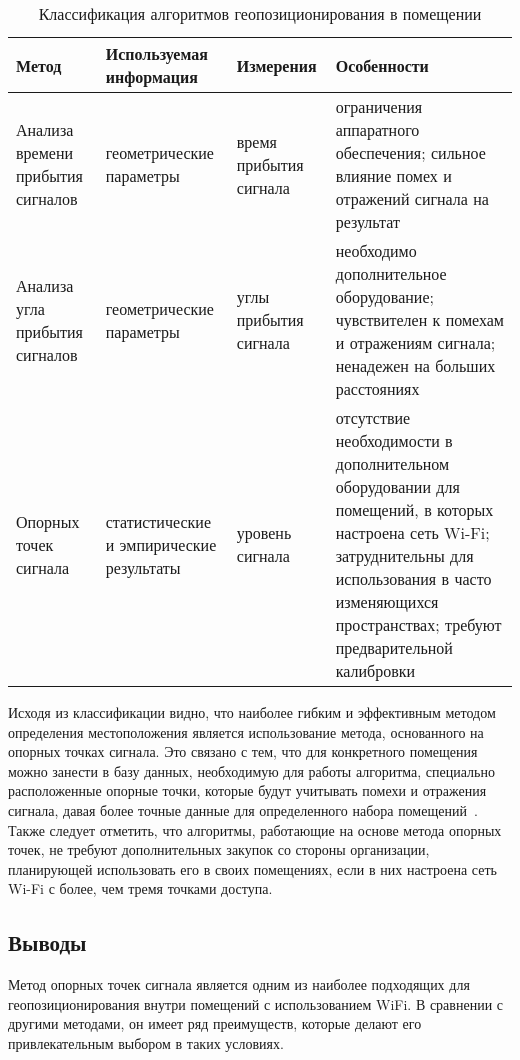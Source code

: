 \begin{table}[ht]
    \caption{Классификация алгоритмов геопозиционирования в помещении}
    \begin{tabular}{|m{3cm}|m{3.5cm}|m{3cm}|m{5.5cm}|}
        \hline
        Метод & Используемая информация & Измерения & Особенности \\
        \hline
        \hline
        Анализа времени прибытия сигналов & геометрические параметры & время прибытия сигнала & ограничения аппаратного обеспечения; сильное влияние помех и отражений сигнала на результат \\
        \hline
        Анализа угла прибытия сигналов & геометрические параметры & углы прибытия сигнала & необходимо дополнительное оборудование; чувствителен к помехам и отражениям сигнала; ненадежен на больших расстояниях \\
        \hline
        Опорных точек сигнала & статистические и эмпирические результаты & уровень сигнала & отсутствие необходимости в дополнительном оборудовании для помещений, в которых настроена сеть Wi-Fi; затруднительны для использования в часто изменяющихся пространствах; требуют предварительной калибровки \\
        \hline
    \end{tabular}
    \label{table:classification}
\end{table}

Исходя из классификации видно, что наиболее гибким и эффективным методом определения местоположения является использование метода, основанного на опорных точках сигнала. Это связано с тем, что для конкретного помещения можно занести в базу данных, необходимую для работы алгоритма, специально расположенные опорные точки, которые будут учитывать помехи и отражения сигнала, давая более точные данные для определенного набора помещений~\cite{bag}. Также следует отметить, что алгоритмы, работающие на основе метода опорных точек, не требуют дополнительных закупок со стороны организации, планирующей использовать его в своих помещениях, если в них настроена сеть Wi-Fi с более, чем тремя точками доступа.

\subsection{Выводы}

Метод опорных точек сигнала является одним из наиболее подходящих для геопозиционирования внутри помещений с использованием WiFi. В сравнении с другими методами, он имеет ряд преимуществ, которые делают его привлекательным выбором в таких условиях.

